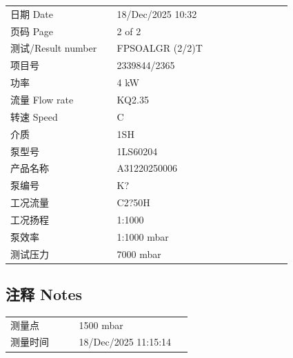\documentclass[UTF8,10pt,a4paper,fontset=fandol]{ctexart}
\newcommand{\fieldvalue}[1]{#1}
\begin{document}
\begin{tabular}{@{}p{0.34\linewidth}p{0.56\linewidth}@{}}
日期 Date &
\fieldvalue{18/Dec/2025 10:32}
\\
页码 Page &
\fieldvalue{2 of 2}
\\
测试/Result number &
\fieldvalue{FPSOALGR (2/2)T}
\\
项目号 &
\fieldvalue{2339844/2365}
\\
功率 &
\fieldvalue{4 kW}
\\
流量 Flow rate &
\fieldvalue{KQ2.35}
\\
转速 Speed &
\fieldvalue{C}
\\
介质 &
\fieldvalue{1SH}
\\
泵型号 &
\fieldvalue{1LS60204}
\\
产品名称 &
\fieldvalue{A31220250006}
\\
泵编号 &
\fieldvalue{K?}
\\
工况流量 &
\fieldvalue{C2?50H}
\\
工况扬程 &
\fieldvalue{1:1000}
\\
泵效率 &
\fieldvalue{1:1000 mbar}
\\
测试压力 &
\fieldvalue{7000 mbar}
\end{tabular}


\subsection{注释 Notes}

\begin{tabular}{@{}p{0.34\linewidth}p{0.56\linewidth}@{}}
测量点 &
\fieldvalue{1500 mbar}
\\
测量时间 &
\fieldvalue{18/Dec/2025 11:15:14}
\end{tabular}
\end{document}
